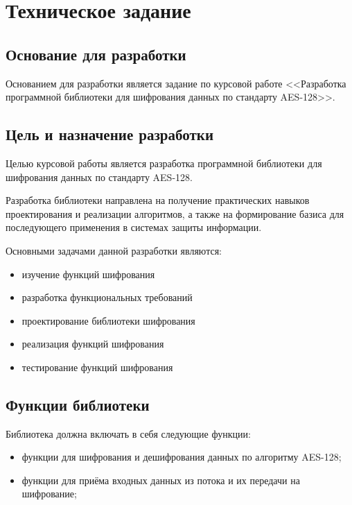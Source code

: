 \section{Техническое задание}
\subsection{Основание для разработки}

Основанием для разработки является задание по курсовой работе 
<<Разработка программной библиотеки для шифрования данных по стандарту AES-128>>. 

\subsection{Цель и назначение разработки}

Целью курсовой работы является разработка программной библиотеки для шифрования данных по стандарту AES-128.  

Разработка библиотеки направлена на получение практических навыков проектирования и реализации  алгоритмов, а также на формирование базиса для последующего применения в системах защиты информации.  

Основными задачами данной разработки являются:
\begin{itemize}
	\item изучение функций шифрования
	\item разработка функциональных требований
	\item проектирование библиотеки шифрования 
	\item реализация функций шифрования
	\item тестирование функций шифрования
\end{itemize}

\subsection{Функции библиотеки}

Библиотека должна включать в себя следующие функции:
\begin{itemize}
	\item  функции для шифрования и дешифрования данных по алгоритму AES-128;
	\item функции для приёма входных данных из потока и их передачи на шифрование;
\end{itemize}



